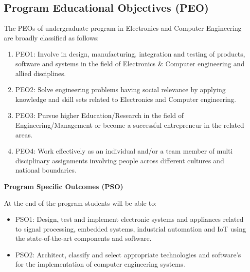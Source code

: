 \documentclass[12pt]{report}	%
\begin{document}
\subsection*{Program Educational Objectives (PEO)}
The PEOs of undergraduate program in Electronics and Computer Engineering are broadly classified as follows:
\begin{enumerate}
    \item PEO1:  Involve in design, manufacturing, integration and testing of products, 	 software and systems in the field of Electronics & Computer engineering and allied  disciplines.
    \item PEO2: Solve engineering problems having social relevance by applying knowledge and skill sets related to Electronics and Computer engineering. 
    \item PEO3:  Pursue higher Education/Research in the field of Engineering/Management or become a successful entrepreneur in the related areas.
    \item PEO4: Work effectively as an individual and/or a team member of multi disciplinary assignments involving people across different cultures and national boundaries.
\end{enumerate}
\newpage
\thispagestyle{empty}
\vspace*{50pt}
\textbf{Program Specific Outcomes (PSO)}

At the end of the program students will be able to:
\thispagestyle{empty}
\begin{itemize}
    \item PSO1:  Design, test and implement electronic systems and appliances related to 		    signal processing, embedded systems, industrial automation and IoT using   	    the state-of-the-art  components and software. 
    \item PSO2:  Architect, classify and select appropriate technologies and software’s for 	 the  implementation of computer engineering systems.
\end{itemize}
\end{document}
